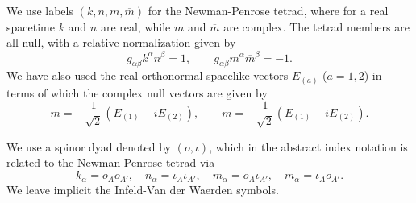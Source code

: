 	We use labels $(k, n, m, \overline{m})$ for the Newman-Penrose tetrad, where for a real spacetime
	$k$ and $n$ are real, while $m$ and $\overline{m}$ are complex. The tetrad
	members are all null, with a relative normalization given by
	\begin{equation}  
	g_{\alpha \beta} k^{\alpha} n^{\beta} = 1, \qquad g_{\alpha \beta} m^{\alpha} \overline{m}^{\beta} = -1.
	\end{equation}
	We have also used the real orthonormal spacelike vectors $E_{(a)}$ ($a = 1, 2$) in terms of which the
	complex null vectors are given by
	\begin{equation}  
	m = -\frac{1}{\sqrt{2}} \left(E_{(1)} - i E_{(2)}\right), \qquad
	\overline{m} = -\frac{1}{\sqrt{2}} \left(E_{(1)} + i E_{(2)}\right).
	\end{equation}
	
	We use a spinor dyad denoted by $(o, \iota )$, which in the abstract index notation is
	related to the Newman-Penrose tetrad via
	\begin{equation}  
	k_{\alpha} = o_{A} \overline{o}_{A'}, \quad  n_{\alpha} = \iota_{A} \overline{\iota}_{A'}, \quad  m_{\alpha} = o_{A}
	\iota_{A'}, \quad  \overline{m}_{\alpha} = \iota_{A} \overline{o}_{A'}.
	\end{equation}
	We leave implicit the Infeld-Van der Waerden symbols.
	
